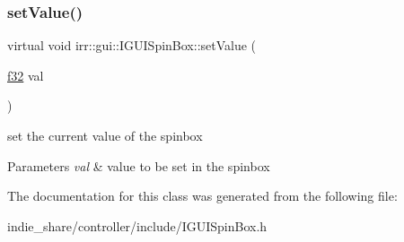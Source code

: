\subsubsection{\texorpdfstring{set\+Value()}{setValue()}}
{\footnotesize\ttfamily virtual void irr\+::gui\+::\+I\+G\+U\+I\+Spin\+Box\+::set\+Value (\begin{DoxyParamCaption}\item[{\hyperlink{namespaceirr_a0277be98d67dc26ff93b1a6a1d086b07}{f32}}]{val }\end{DoxyParamCaption})\hspace{0.3cm}{\ttfamily [pure virtual]}}



set the current value of the spinbox 


\begin{DoxyParams}{Parameters}
{\em val} & value to be set in the spinbox \\
\hline
\end{DoxyParams}


The documentation for this class was generated from the following file\+:\begin{DoxyCompactItemize}
\item 
indie\+\_\+share/controller/include/I\+G\+U\+I\+Spin\+Box.\+h\end{DoxyCompactItemize}
